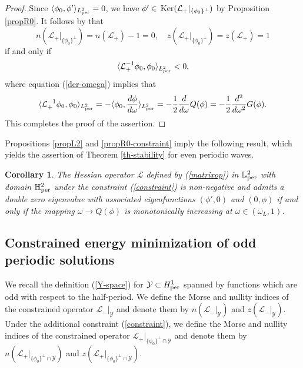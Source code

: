\documentclass[12pt,reqno]{amsart}
\newcommand{\Ker}{{\rm \,Ker}}
\numberwithin{equation}{section}
\numberwithin{figure}{section}
\newtheorem{corollary}[theorem]{Corollary}
\begin{document}
\begin{proof}
Since $\langle \phi_0, \phi' \rangle_{L^2_{\rm per}} = 0$, we have $\phi' \in \Ker(\mathcal{L}_+ |_{\{ \phi_0\}^{\perp}})$ by Proposition \ref{propR0}. It follows by \cite[Theorem 2.7]{GeyerPel25} that 
$$
n(\mathcal{L}_+ |_{\{ \phi_0\}^{\perp}}) = n(\mathcal{L}_+) - 1 = 0, \quad 
z(\mathcal{L}_+ |_{\{ \phi_0\}^{\perp}}) = z(\mathcal{L}_+) = 1
$$
if and only if 
$$
\langle \mathcal{L}_+^{-1} \phi_0, \phi_0 \rangle_{L^2_{\rm per}} < 0, 
$$
where equation (\ref{der-omega}) implies that 
$$
\langle \mathcal{L}_+^{-1} \phi_0, \phi_0 \rangle_{L^2_{\rm per}} = 
- \langle \phi_0, \frac{d \phi}{d \omega} \rangle_{L^2_{\rm per}} =- \frac{1}{2} \frac{d}{d\omega} Q(\phi) = - \frac{1}{2} \frac{d^2}{d \omega^2} G(\phi).
$$ 
This completes the proof of the assertion.
\end{proof}	

Propositions \ref{propL2} and \ref{propR0-constraint} imply the following result, which yields the assertion of Theorem \ref{th-stability} for even periodic waves.

\begin{corollary}
		The Hessian operator $\mathcal{L}$ defined by (\ref{matrixop}) in  $\mathbb{L}^2_{\rm per}$ with domain $\mathbb{H}^2_{\rm per}$ under the constraint (\ref{constraint}) is non-negative and admits a double zero eigenvalue with associated eigenfunctions $(\phi',0)$ and $(0,\phi)$ if and only if the mapping $\omega \to Q(\phi)$ is monotonically increasing at $\omega \in (\omega_L,1)$. 
\end{corollary}	 
		 
		 	
		 
		  
\subsection{Constrained energy minimization of odd periodic solutions} 

We recall the definition (\ref{Y-space}) for $\mathcal{Y}\subset H^1_{\rm per}$ spanned by functions which are odd with respect to the half-period. 
We define the Morse and nullity indices of the constrained operator $\mathcal{L}_- |_{\mathcal{Y}}$ and denote them by $n(\mathcal{L}_- |_{\mathcal{Y}})$ and $z(\mathcal{L}_- |_{\mathcal{Y}})$.
Under the additional constraint (\ref{constraint}), we define the Morse and nullity indices of the constrained operator $\mathcal{L}_+ |_{\{ \phi_0 \}^{\perp}  \cap \mathcal{Y}}$ 
and denote them by $n(\mathcal{L}_+ |_{\{ \phi_0\}^{\perp}  \cap \mathcal{Y}})$ and $z(\mathcal{L}_+ |_{\{ \phi_0\}^{\perp}  \cap \mathcal{Y}})$. 
\end{document}
